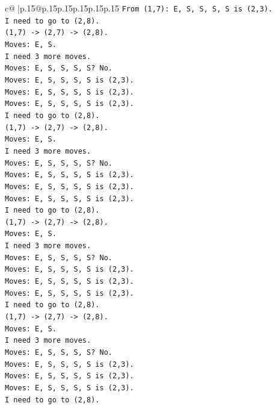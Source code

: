 \documentclass{article}
\begin{document}
{\begin{supertabular}{c@{$\;$}|p{.15\linewidth}@{}p{.15\linewidth}p{.15\linewidth}p{.15\linewidth}p{.15\linewidth}p{.15\linewidth}}
{{{\texttt{From (1,7): E, S, S, S, S is (2,3).} \\
\texttt{I need to go to (2,8).} \\
\texttt{(1,7) {-}> (2,7) {-}> (2,8).} \\
\texttt{Moves: E, S.} \\
\texttt{I need 3 more moves.} \\
\texttt{Moves: E, S, S, S, S? No.} \\
\texttt{Moves: E, S, S, S, S is (2,3).} \\
\texttt{Moves: E, S, S, S, S is (2,3).} \\
\texttt{Moves: E, S, S, S, S is (2,3).} \\
\texttt{I need to go to (2,8).} \\
\texttt{(1,7) {-}> (2,7) {-}> (2,8).} \\
\texttt{Moves: E, S.} \\
\texttt{I need 3 more moves.} \\
\texttt{Moves: E, S, S, S, S? No.} \\
\texttt{Moves: E, S, S, S, S is (2,3).} \\
\texttt{Moves: E, S, S, S, S is (2,3).} \\
\texttt{Moves: E, S, S, S, S is (2,3).} \\
\texttt{I need to go to (2,8).} \\
\texttt{(1,7) {-}> (2,7) {-}> (2,8).} \\
\texttt{Moves: E, S.} \\
\texttt{I need 3 more moves.} \\
\texttt{Moves: E, S, S, S, S? No.} \\
\texttt{Moves: E, S, S, S, S is (2,3).} \\
\texttt{Moves: E, S, S, S, S is (2,3).} \\
\texttt{Moves: E, S, S, S, S is (2,3).} \\
\texttt{I need to go to (2,8).} \\
\texttt{(1,7) {-}> (2,7) {-}> (2,8).} \\
\texttt{Moves: E, S.} \\
\texttt{I need 3 more moves.} \\
\texttt{Moves: E, S, S, S, S? No.} \\
\texttt{Moves: E, S, S, S, S is (2,3).} \\
\texttt{Moves: E, S, S, S, S is (2,3).} \\
\texttt{Moves: E, S, S, S, S is (2,3).} \\
\texttt{I need to go to (2,8).} \\
}}}
\end{supertabular}}
\end{document}
